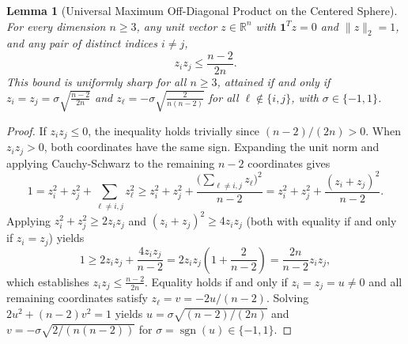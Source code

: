 \documentclass[11pt,reqno]{article}
\newtheorem{lemma}[theorem]{Lemma}
\theoremstyle{definition}
\newcommand{\R}{\mathbb{R}}
\newcommand{\one}{\mathbf{1}}
\begin{document}
\begin{itemize}
    \begin{lemma}[Universal Maximum Off-Diagonal Product on the Centered Sphere]\label{lem:max-offdiag}
    For every dimension $n \ge 3$, any unit vector $z \in \R^n$ with $\one^T z = 0$ and $\|z\|_2 = 1$, and any pair of distinct indices $i \ne j$,
    \begin{equation}
    z_i z_j \le \frac{n - 2}{2n}.
    \end{equation}
    This bound is uniformly sharp for all $n \ge 3$, attained if and only if $z_i = z_j = \sigma \sqrt{\frac{n-2}{2n}}$ and $z_\ell = -\sigma \sqrt{\frac{2}{n(n-2)}}$ for all $\ell \notin \{i, j\}$, with $\sigma \in \{-1, 1\}$.
    \end{lemma}
    \begin{proof}
    If $z_i z_j \le 0$, the inequality holds trivially since $(n-2)/(2n) > 0$. When $z_i z_j > 0$, both coordinates have the same sign. Expanding the unit norm and applying Cauchy-Schwarz to the remaining $n-2$ coordinates gives
    \[
    1 = z_i^2 + z_j^2 + \sum_{\ell \ne i, j} z_\ell^2 \ge z_i^2 + z_j^2 + \frac{\bigl(\sum_{\ell \ne i, j} z_\ell\bigr)^2}{n - 2} = z_i^2 + z_j^2 + \frac{(z_i + z_j)^2}{n - 2}.
    \]
    Applying $z_i^2 + z_j^2 \ge 2 z_i z_j$ and $(z_i + z_j)^2 \ge 4 z_i z_j$ (both with equality if and only if $z_i = z_j$) yields
    \[
    1 \ge 2 z_i z_j + \frac{4 z_i z_j}{n - 2} = 2 z_i z_j \left(1 + \frac{2}{n - 2}\right) = \frac{2n}{n - 2} z_i z_j,
    \]
    which establishes $z_i z_j \le \frac{n - 2}{2n}$. Equality holds if and only if $z_i = z_j = u \ne 0$ and all remaining coordinates satisfy $z_\ell = v = -2u/(n-2)$. Solving $2u^2 + (n-2)v^2 = 1$ yields $u = \sigma \sqrt{(n-2)/(2n)}$ and $v = -\sigma \sqrt{2/(n(n-2))}$ for $\sigma = \operatorname{sgn}(u) \in \{-1, 1\}$.
    \end{proof}


\end{itemize}
\end{document}
